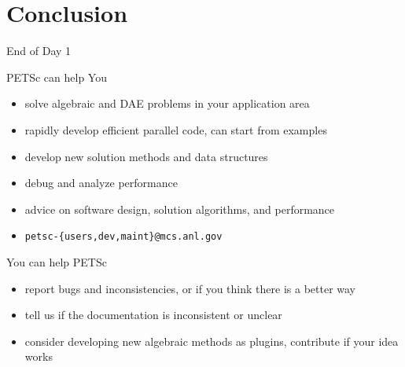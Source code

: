 \section{Conclusion}
\begin{frame}{End of Day 1}
 
 \begin{block}{PETSc can help You}
  \begin{itemize}
   \item solve algebraic and DAE problems in your application area
   \item rapidly develop efficient parallel code, can start from examples
   \item develop new solution methods and data structures
   \item debug and analyze performance
   \item advice on software design, solution algorithms, and performance
   \item \centering \texttt{petsc-\{users,dev,maint\}@mcs.anl.gov}

  \end{itemize}
 \end{block}

 \begin{block}{You can help PETSc}
  \begin{itemize}
   \item report bugs and inconsistencies, or if you think there is a better way
   \item tell us if the documentation is inconsistent or unclear
   \item consider developing new algebraic methods as plugins, contribute if your idea works
  \end{itemize}
 \end{block}

\end{frame}
